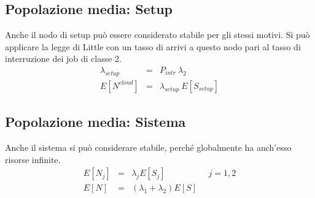 \subsection{Popolazione media: Setup}
Anche il nodo di setup può essere considerato stabile per gli stessi motivi.
Si può applicare la legge di Little con un tasso di arrivi a questo nodo pari al
tasso di interruzione dei job di classe 2.
\begin{eqnarray}
\lambda_{setup} &=& P_{intr} \ \lambda_2    \nonumber \\
E[N^{cloud}] &=& \lambda_{setup} \ E[S_{setup}] 
\end{eqnarray}
%
\subsection{Popolazione media: Sistema}
Anche il sistema si può considerare stabile, perché globalmente ha anch'esso
risorse infinite.
\begin{eqnarray}
E[N_j] &=& \lambda_j E[S_j]  \qquad\quad\qquad j=1,2 \\
E[N] &=& (\lambda_1 + \lambda_2) E[S]
\end{eqnarray}
%
